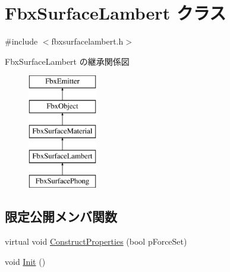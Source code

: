 \hypertarget{class_fbx_surface_lambert}{}\section{Fbx\+Surface\+Lambert クラス}
\label{class_fbx_surface_lambert}


{\ttfamily \#include $<$fbxsurfacelambert.\+h$>$}

Fbx\+Surface\+Lambert の継承関係図\begin{figure}[H]
\begin{center}
\leavevmode
\includegraphics[height=5.000000cm]{class_fbx_surface_lambert}
\end{center}
\end{figure}
\subsection*{限定公開メンバ関数}
\begin{DoxyCompactItemize}
\item 
virtual void \hyperlink{class_fbx_surface_lambert_a6693e1c08050978c78eece2aa48688e9}{Construct\+Properties} (bool p\+Force\+Set)
\item 
void \hyperlink{class_fbx_surface_lambert_adacdc8eb6bcebc3cdd8e134d5a01f1b1}{Init} ()
\end{DoxyCompactItemize}
